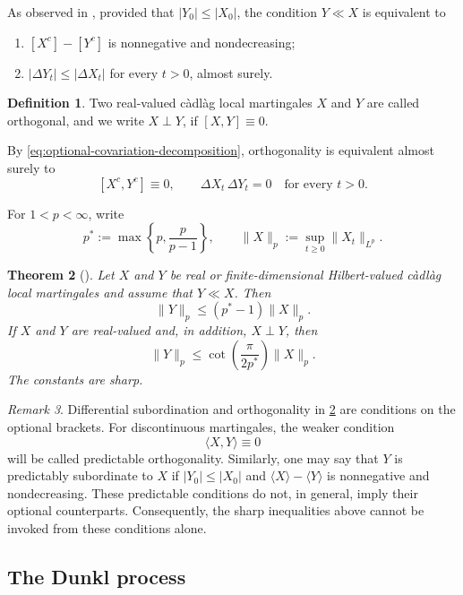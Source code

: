 \documentclass[11pt]{amsart}
\newtheorem{theorem}{Theorem}[section]
\theoremstyle{definition}
\newtheorem{definition}[theorem]{Definition}
\theoremstyle{remark}
\newtheorem{remark}[theorem]{Remark}
\numberwithin{equation}{section}
\begin{document}
As observed in \cite{W95}, provided that $|Y_0|\leq|X_0|$, the condition
$Y\ll X$ is equivalent to
\begin{enumerate}
\item $[X^c]-[Y^c]$ is nonnegative and nondecreasing;
\item $|\Delta Y_t|\leq|\Delta X_t|$ for every $t>0$, almost surely.
\end{enumerate}

\begin{definition}
Two real-valued c\`adl\`ag local martingales $X$ and $Y$ are called
orthogonal, and we write $X\perp Y$, if $[X,Y]\equiv0$.
\end{definition}

By \eqref{eq:optional-covariation-decomposition},
orthogonality is equivalent almost surely to
\[
[X^c,Y^c]\equiv0,
\qquad
\Delta X_t\,\Delta Y_t=0
\quad\text{for every }t>0.
\]

For $1<p<\infty$, write
\[
p^*:=\max\left\{p,\frac p{p-1}\right\},
\qquad
\|X\|_p:=\sup_{t\geq0}\|X_t\|_{L^p}.
\]

\begin{theorem}[\cite{W95,BW96}]
\label{thm:sharp-martingale-inequalities}
Let $X$ and $Y$ be real or finite-dimensional Hilbert-valued c\`adl\`ag local martingales and assume that
$Y\ll X$. Then
\[
\|Y\|_p
\leq
(p^*-1)\|X\|_p.
\]
If $X$ and $Y$ are real-valued and, in addition, $X\perp Y$, then
\[
\|Y\|_p
\leq
\cot\left(\frac{\pi}{2p^*}\right)\|X\|_p.
\]
The constants are sharp.
\end{theorem}

\begin{remark}
Differential subordination and orthogonality in
\cref{thm:sharp-martingale-inequalities} are conditions on the
optional brackets. For discontinuous martingales, the weaker condition
\[
\langle X,Y\rangle\equiv0
\]
will be called predictable orthogonality. Similarly, one may say that
$Y$ is predictably subordinate to $X$ if $|Y_0|\leq|X_0|$ and
$\langle X\rangle-\langle Y\rangle$
is nonnegative and nondecreasing. These predictable conditions do not,
in general, imply their optional counterparts. Consequently, the sharp
inequalities above cannot be invoked from these conditions alone.
\end{remark}

\subsection{The Dunkl process}
\end{document}
